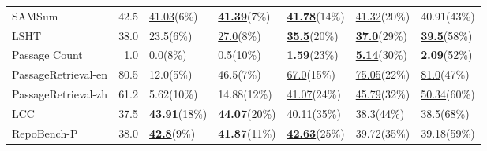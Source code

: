 \begin{tabular}{lrlllll}
SAMSum & 42.5 & \underline{41.03}(6\%) & \underline{\textbf{41.39}}(7\%) & \underline{\textbf{41.78}}(14\%) & \underline{41.32}(20\%) & 40.91(43\%) \\
LSHT & 38.0 & 23.5(6\%) & \underline{27.0}(8\%) & \underline{\textbf{35.5}}(20\%) & \underline{\textbf{37.0}}(29\%) & \underline{\textbf{39.5}}(58\%) \\
Passage Count & 1.0 & 0.0(8\%) & 0.5(10\%) & \textbf{1.59}(23\%) & \underline{\textbf{5.14}}(30\%) & \textbf{2.09}(52\%) \\
PassageRetrieval-en & 80.5 & 12.0(5\%) & 46.5(7\%) & \underline{67.0}(15\%) & \underline{75.05}(22\%) & \underline{81.0}(47\%) \\
PassageRetrieval-zh & 61.2 & 5.62(10\%) & 14.88(12\%) & \underline{41.07}(24\%) & \underline{45.79}(32\%) & \underline{50.34}(60\%) \\
LCC & 37.5 & \textbf{43.91}(18\%) & \textbf{44.07}(20\%) & 40.11(35\%) & 38.3(44\%) & 38.5(68\%) \\
RepoBench-P & 38.0 & \underline{\textbf{42.8}}(9\%) & \textbf{41.87}(11\%) & \underline{\textbf{42.63}}(25\%) & 39.72(35\%) & 39.18(59\%) \\
\bottomrule
\end{tabular}